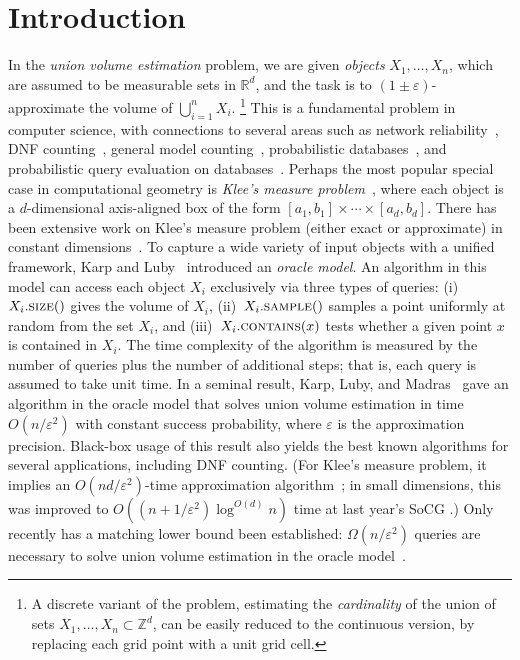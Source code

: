 \documentclass[11pt]{article}
\def\Real{\mathbb{R}}
\def\Integer{\mathbb{Z}}
\let\R\Real
\let\Z\Integer
\newcommand{\size}{\textsc{size}}
\newcommand{\sample}{\textsc{sample}}
\newcommand{\contains}{\textsc{contains}}
\newcommand{\eps}{\varepsilon}
\begin{document}
\section{Introduction}
In the \emph{union volume estimation} problem, we are given \emph{objects} $X_1,\ldots,X_n$, which are assumed to be measurable sets in $\R^d$, and the task is to $(1\pm\eps)$-approximate the volume of $\bigcup_{i=1}^n X_i$.%
\footnote{A discrete variant of the problem, estimating the \emph{cardinality} of the union of sets $X_1,\ldots,X_n \subset \Z^d$, can be easily reduced to the continuous version, by replacing each grid point with a unit grid cell.}
This is a fundamental problem in computer science, with connections to several areas such as network reliability~\cite{Karger01, KarpLM89}, DNF counting~\cite{KarpLM89}, general model counting~\cite{pavan2023model, chakraborty2013scalable}, probabilistic databases~\cite{kimelfeld2008query, DalviS07, re2006efficient}, and probabilistic query evaluation on databases~\cite{carmeli2020answering, carmeli2023tractable}.
Perhaps the most popular special case in computational geometry is 
\emph{Klee's measure problem}~\cite{Klee77}, where each object is a $d$-dimensional axis-aligned box of the form $[a_1, b_1] \times \cdots \times [a_d, b_d]$. There has been extensive work on Klee's measure problem (either exact or approximate) in constant dimensions~\cite{OY91,Chan10,Chan13,Kunnemann22,GorbachevK23,BLNRW25}.
%
To capture a wide variety of input objects with a unified framework, Karp and Luby~\cite{KarpL85} introduced an \emph{oracle model}. An algorithm in this model can access each object $X_i$ exclusively via three types of queries: (i)~$X_i.\size()$ gives the volume of $X_i$, (ii)~$X_i.\sample()$ samples a point uniformly at random from the set $X_i$, and (iii)~$X_i.\contains(x)$ tests whether a given point $x$ is contained in $X_i$. The time complexity of the algorithm is measured by the number of queries plus the number of additional steps; that is, each query is assumed to take unit time. In a seminal result, Karp, Luby, and Madras~\cite{KarpLM89} gave an algorithm in the oracle model that solves union volume estimation in time $O(n/\eps^2)$ with constant success probability, where $\eps$ is the approximation precision. Black-box usage of this result also yields the best known algorithms for several applications, including DNF counting. (For Klee's measure problem, it implies an $O(nd / \eps^2)$-time approximation algorithm~\cite{BringmannF10}; in small dimensions, this was improved to $O((n+ 1/\eps^2)\log^{O(d)}n)$ time at last year's SoCG \cite{BLNRW25}.) Only recently has a matching lower bound been established: $\Omega(n/\eps^2)$ queries are necessary to solve union volume estimation in the oracle model~\cite{BLNRW25}.
\end{document}
